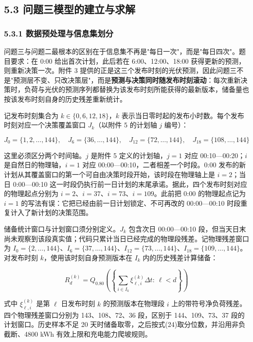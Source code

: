 \documentclass[12pt,a4paper]{ctexart}
\begin{document}
\subsection*{5.3 问题三模型的建立与求解}

\subsubsection*{5.3.1 数据预处理与信息集划分}

问题三与问题二最根本的区别在于信息集不再是"每日一次"，而是"每日四次"。题目要求：在 0:00 给出首次计划，此后若在 6:00、12:00、18:00 获得更新的预测，则重新决策一次。附件 3 提供的正是这三个发布时刻的光伏预测，因此问题三不是"预测层不变、只改决策层"，而是\textbf{预测与决策同时随发布时刻滚动}：每次重新决策时，负荷与光伏的预测序列都替换为该发布时刻所能获得的最新版本，储备量也按该发布时刻自身的历史残差重新统计。

记发布时刻集合为 $k\in\{0,6,12,18\}$，$k$ 表示当日零时起的发布小时数。每个发布时刻对应一个决策覆盖窗口 $J_k$（以附件 5 的计划轴 $j$ 编号）：

\begin{equation}
J_0=\{1,2,\dots,144\},\quad J_6=\{36,\dots,144\},\quad J_{12}=\{72,\dots,144\},\quad J_{18}=\{108,\dots,144\}
\end{equation}

这里必须区分两个时间轴。$j$ 是附件 5 定义的计划轴，$j=1$ 对应 00:10—00:20；$i$ 是自然日的物理轴，$i=1$ 对应 00:00—00:10，二者相差一个时段。0:00 发布的新计划从其覆盖窗口的第一个可自由决策时段开始，该时段在物理轴上是 $i=2$；当日 0:00—00:10 这一时段仍执行前一日计划的末尾承诺。据此，四个发布时刻对应的物理起点分别为 $i=2$、$i=37$、$i=73$、$i=109$。此前把 0:00 的物理起点记为 $i=1$ 的写法有误：它把已经由前一日计划锁定、不可再改的 00:00—00:10 时段重复计入了新计划的决策范围。

储备统计窗口与计划窗口须分别定义。$J_k$ 包含次日 00:00—00:10 段，但当天日末尚未观察到该段真实值；代码只累计当日已经完成的物理段残差。记物理残差窗口为 $I_0=\{2,\ldots,144\}$、$I_6=\{37,\ldots,144\}$、$I_{12}=\{73,\ldots,144\}$、$I_{18}=\{109,\ldots,144\}$。对发布时刻 $k$，使用该时刻自身预测版本在 $I_k$ 内的历史残差计算储备：

\begin{equation}
R_d^{(k)}=Q_{0.80}\left(\left\{\sum_{i\in I_k}\xi_{\ell,i}^{(k)}\Delta t:\ \ell<d\right\}\right)
\end{equation}

式中 $\xi_{\ell,i}^{(k)}$ 是第 $\ell$ 日发布时刻 $k$ 的预测版本在物理段 $i$ 上的带符号净负荷残差。四个物理残差窗口分别为 143、108、72、36 段，区别于 144、109、73、37 段的计划窗口。历史样本不足 20 天时储备取零，之后按式(24)取分位数，并沿用非负截断、4800 kWh 有效上限和充电能力爬坡规则。
\end{document}
